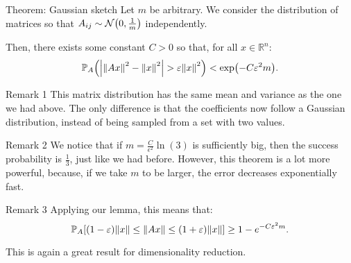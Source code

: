 \documentclass[a4paper]{article}
\begin{document}
\begin{parag}{Theorem: Gaussian sketch}
    Let $m$ be arbitrary. We consider the distribution of matrices so that $A_{ij} \followsdistr \mathcal{N}\left(0, \frac{1}{m}\right)$ independently.

    Then, there exists some constant $C > 0$ so that, for all $x \in \mathbb{R}^n$:
    \[\prob_A\left(\left|\left\|A x\right\|^2 - \left\|x\right\|^2\right| > \epsilon \left\|x\right\|^2\right) < \exp\left(-C \epsilon^2 m\right).\]

    \begin{subparag}{Remark 1}
        This matrix distribution has the same mean and variance as the one we had above. The only difference is that the coefficients now follow a Gaussian distribution, instead of being sampled from a set with two values.
    \end{subparag}

    \begin{subparag}{Remark 2}
        We notice that if $m = \frac{C}{\epsilon^2} \ln\left(3\right)$ is sufficiently big, then the success probability is $\frac{1}{3}$, just like we had before. However, this theorem is a lot more powerful, because, if we take $m$ to be larger, the error decreases exponentially fast.
    \end{subparag}

    \begin{subparag}{Remark 3}
        Applying our lemma, this means that:
        \[\prob_A\left[\left(1 - \epsilon\right)\left\|x\right\| \leq \left\|A x\right\| \leq \left(1 + \epsilon\right) \left\|x\right\|\right] \geq 1 - e^{-C \epsilon^2 m}.\]

        This is again a great result for dimensionality reduction.
    \end{subparag}
\end{parag}
\end{document}
